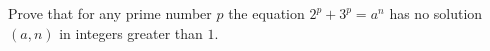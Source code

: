 Prove that for any prime number $p$ the equation $2^p + 3^p = a^n$ has no solution $(a,n)$ in integers greater than $1$.

